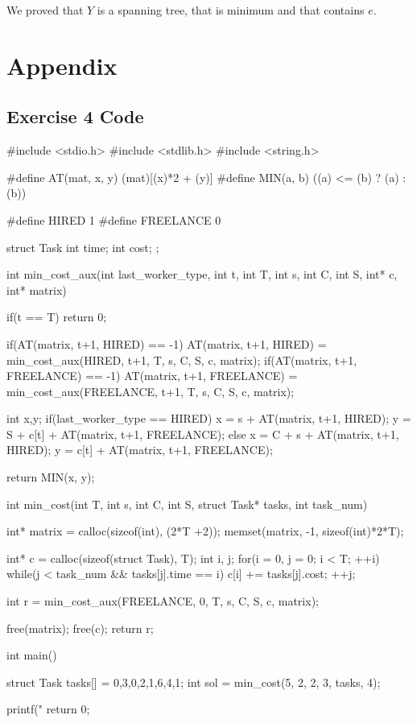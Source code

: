 \documentclass[paper=a4, fontsize=11pt]{scrartcl} %
\numberwithin{equation}{section} %
\numberwithin{figure}{section} %
\numberwithin{table}{section} %
\begin{document}
We proved that $Y$ is a spanning tree, that is minimum and that contains $e$.

\newpage

\section*{Appendix}

\subsection*{Exercise 4 Code}

\begin{ccode}
#include <stdio.h>
#include <stdlib.h>
#include <string.h>

#define AT(mat, x, y) (mat)[(x)*2 + (y)]
#define MIN(a, b) ((a) <= (b) ? (a) : (b))

#define HIRED 1
#define FREELANCE 0

struct Task
{
    int time;
    int cost;
};

int min_cost_aux(int last_worker_type, int t, int T, int s, int C, int S, int* c, int* matrix)
{
  if(t == T)
    return 0;
  
  if(AT(matrix, t+1, HIRED) == -1)
    AT(matrix, t+1, HIRED) = min_cost_aux(HIRED, t+1, T, s, C, S, c, matrix);
  if(AT(matrix, t+1, FREELANCE) == -1)
    AT(matrix, t+1, FREELANCE) = min_cost_aux(FREELANCE, t+1, T, s, C, S, c, matrix);
  
  int x,y;
  if(last_worker_type == HIRED) {
    x = s + AT(matrix, t+1, HIRED);
    y = S + c[t] + AT(matrix, t+1, FREELANCE);
  }
  else {
    x = C + s + AT(matrix, t+1, HIRED);
    y = c[t] + AT(matrix, t+1, FREELANCE);
  }
  
  return MIN(x, y);
}


int min_cost(int T, int s, int C, int S, struct Task* tasks, int task_num)
{
    int* matrix = calloc(sizeof(int), (2*T +2));
    memset(matrix, -1, sizeof(int)*2*T);
    
    int* c = calloc(sizeof(struct Task), T);
    int i, j;
    for(i = 0, j = 0; i < T; ++i) {
        while(j < task_num && tasks[j].time == i) {
            c[i] += tasks[j].cost;
            ++j;
        }
    }
    
    int r = min_cost_aux(FREELANCE, 0, T, s, C, S, c, matrix);
    
    free(matrix);
    free(c);
    return r;
}

int main()
{
    struct Task tasks[] = {{0,3},{0,2},{1,6},{4,1}};
    int sol = min_cost(5, 2, 2, 3, tasks, 4);
    
    printf("%
    return 0;
}
\end{ccode}
\end{document}
